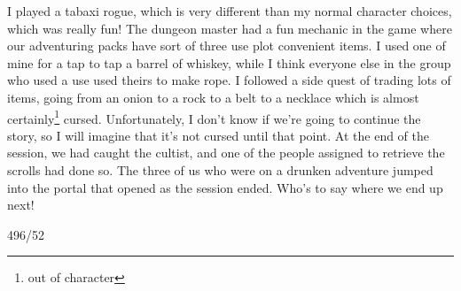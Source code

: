 \documentclass[12pt]{article}[titlepage]
\renewcommand{\,}{\textsuperscript{,}}
\begin{document}
I played a tabaxi rogue, which is very different than my normal character choices, which was really fun!
The dungeon master had a fun mechanic in the game where our adventuring packs have sort of three use plot convenient items.
I used one of mine for a tap to tap a barrel of whiskey, while I think everyone else in the group who used a use used theirs to make rope.
I followed a side quest of trading lots of items, going from an onion to a rock to a belt to a necklace which is almost certainly\footnote{out of character} cursed.
Unfortunately, I don't know if we're going to continue the story, so I will imagine that it's not cursed until that point.
At the end of the session, we had caught the cultist, and one of the people assigned to retrieve the scrolls had done so.
The three of us who were on a drunken adventure jumped into the portal that opened as the session ended.
Who's to say where we end up next!

496/52
\end{document}
